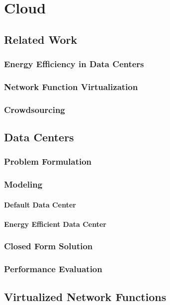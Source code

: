 \chapter{Cloud}\label{chap:cloud}

\section{Related Work}
\subsection{Energy Efficiency in Data Centers}
\subsection{Network Function Virtualization}
\subsection{Crowdsourcing}

\section{Data Centers}
\cite{Schwartz2012a}
\subsection{Problem Formulation}
\subsection{Modeling}
\subsubsection*{Default Data Center}
\subsubsection*{Energy Efficient Data Center}
\subsection{Closed Form Solution}
\subsection{Performance Evaluation}

\section{Virtualized Network Functions}
\cite{Metzger2014a}
